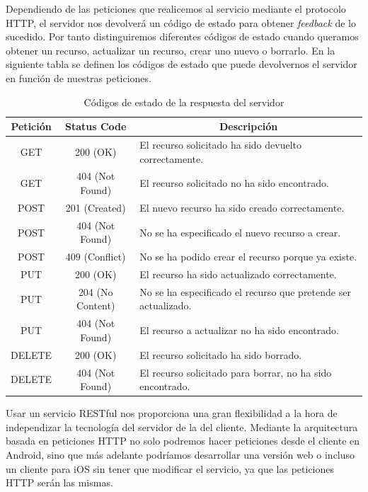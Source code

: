 Dependiendo de las peticiones que realicemos al servicio mediante el protocolo HTTP, el servidor nos devolverá un código de estado para obtener \textit{feedback} de lo sucedido. Por tanto distinguiremos diferentes códigos de estado cuando queramos obtener un recurso, actualizar un recurso, crear uno nuevo o borrarlo. En la siguiente tabla se definen los códigos de estado que puede devolvernos el servidor en función de nuestras peticiones.

\begin{table}[!]
\begin{tabular}{|c|c|m{7.5cm}|}
\hline
{\bf Petición} & {\bf Status Code} & \multicolumn{1}{c|}{{\bf Descripción}}                         \\ \hline
GET            & 200 (OK)          & El recurso solicitado ha sido devuelto correctamente.          \\ \hline
GET            & 404 (Not Found)   & El recurso solicitado no ha sido encontrado.                   \\ \hline
POST           & 201 (Created)     & El nuevo recurso ha sido creado correctamente.                 \\ \hline
POST           & 404 (Not Found)   & No se ha especificado el nuevo recurso a crear.                \\ \hline
POST           & 409 (Conflict)    & No se ha podido crear el recurso porque ya existe.             \\ \hline
PUT            & 200 (OK)          & El recurso ha sido actualizado correctamente.                  \\ \hline
PUT            & 204 (No Content)  & No se ha especificado el recurso que pretende ser actualizado. \\ \hline
PUT            & 404 (Not Found)   & El recurso a actualizar no ha sido encontrado.                 \\ \hline
DELETE         & 200 (OK)          & El recurso solicitado ha sido borrado.                         \\ \hline
DELETE         & 404 (Not Found)   & El recurso solicitado para borrar, no ha sido encontrado.      \\ \hline
\end{tabular}
\caption{Códigos de estado de la respuesta del servidor}
\label{fig:codeStateRestTable}
\end{table}

Usar un servicio RESTful nos proporciona una gran flexibilidad a la hora de independizar la tecnología del servidor de la del cliente. Mediante la arquitectura basada en peticiones HTTP no solo podremos hacer peticiones desde el cliente en Android, sino que más adelante podríamos desarrollar una versión web o incluso un cliente para iOS sin tener que modificar el servicio, ya que las peticiones HTTP serán las mismas.

